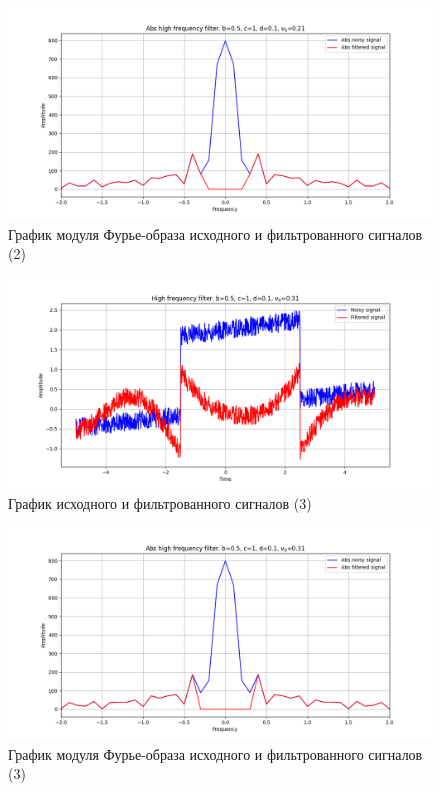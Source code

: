 \documentclass[a4paper, 12pt]{article}
\begin{document}
    \begin{figure}[H]
        \centering
        \includegraphics[scale=0.48]{2_abs_u_U_nolow.png}
        \captionsetup{skip=0pt}
        \caption{График модуля Фурье-образа исходного и фильтрованного сигналов (2)}
        \label{fig:fig30}
    \end{figure}
    \begin{figure}[!htb]
        \centering
        \includegraphics[scale=0.48]{3_u_flt_u_nolow.png}
        \captionsetup{skip=0pt}
        \caption{График исходного и фильтрованного сигналов (3)}
        \label{fig:fig31}
    \end{figure}
    \newpage
    \begin{figure}[!htb]
        \centering
        \includegraphics[scale=0.48]{3_abs_u_U_nolow.png}
        \captionsetup{skip=0pt}
        \caption{График модуля Фурье-образа исходного и фильтрованного сигналов (3)}
        \label{fig:fig32}
    \end{figure}
\end{document}
